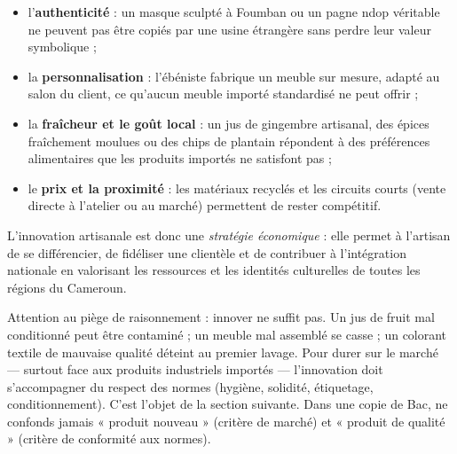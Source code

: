 \documentclass[11pt]{article}
\newcommand{\cle}[1]{{\popxbold\color{popdark}#1}}
\begin{document}
\begin{itemize}
\item l'\textbf{authenticité} : un masque sculpté à Foumban ou un pagne ndop véritable ne peuvent pas être copiés par une usine étrangère sans perdre leur valeur symbolique ;
\item la \textbf{personnalisation} : l'ébéniste fabrique un meuble sur mesure, adapté au salon du client, ce qu'aucun meuble importé standardisé ne peut offrir ;
\item la \textbf{fraîcheur et le goût local} : un jus de gingembre artisanal, des épices fraîchement moulues ou des chips de plantain répondent à des préférences alimentaires que les produits importés ne satisfont pas ;
\item le \textbf{prix et la proximité} : les matériaux recyclés et les circuits courts (vente directe à l'atelier ou au marché) permettent de rester compétitif.
\end{itemize}

L'innovation artisanale est donc une \emph{stratégie économique} : elle permet à l'artisan de se différencier, de fidéliser une clientèle et de contribuer à l'\cle{intégration nationale} en valorisant les ressources et les identités culturelles de toutes les régions du Cameroun.

\begin{attention}
Attention au piège de raisonnement : innover ne suffit pas. Un jus de fruit mal conditionné peut être contaminé ; un meuble mal assemblé se casse ; un colorant textile de mauvaise qualité déteint au premier lavage. Pour durer sur le marché — surtout face aux produits industriels importés — l'innovation doit s'accompagner du \cle{respect des normes} (hygiène, solidité, étiquetage, conditionnement). C'est l'objet de la section suivante. Dans une copie de Bac, ne confonds jamais « produit nouveau » (critère de marché) et « produit de qualité » (critère de conformité aux normes).
\end{attention}
\end{document}
